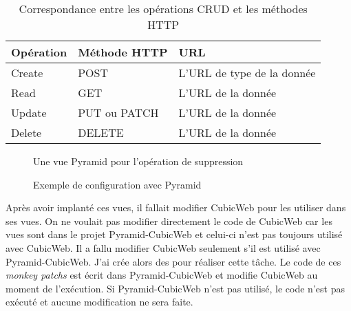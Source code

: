     \begin{table}
        \centering
        \begin{tabular}{|>{\centering\arraybackslash}m{}
        					|>{\centering\arraybackslash}m{}
        					|>{\centering\arraybackslash}m{}|}
        \hline
        \cellcolor{Gray} \textbf{Opération} & 
        \cellcolor{Gray} \textbf{Méthode HTTP} &
        \cellcolor{Gray} \textbf{URL} \\ \hline
        Create & POST & L'URL de type de la donnée\\ \hline
        Read   & GET & L'URL de la donnée\\ \hline
        Update & PUT ou PATCH & L'URL de la donnée \\ \hline
        Delete & DELETE & L'URL de la donnée \\ \hline
    \end{tabular}
    \caption{Correspondance entre les opérations CRUD et les méthodes HTTP}
    \label{table:crud}
\end{table}


\begin{figure}[htp]
    \centering
    \caption{Une vue Pyramid pour l'opération de suppression}
    \label{fig:delete}
\end{figure}

\begin{figure}[htp]
    \centering
    \caption{Exemple de configuration avec Pyramid}
    \label{fig:figpyramidconf}
\end{figure}



Après avoir implanté ces vues, il fallait modifier CubicWeb pour les utiliser dans ses vues. On ne voulait pas modifier directement le code de CubicWeb car les vues sont dans le projet Pyramid-CubicWeb et celui-ci n'est pas toujours utilisé avec CubicWeb. Il a fallu modifier CubicWeb seulement s'il est utilisé avec Pyramid-CubicWeb. J'ai crée alors des  pour réaliser cette tâche. Le code de ces \textit{monkey patchs} est écrit dans Pyramid-CubicWeb et modifie CubicWeb au moment de l'exécution. Si Pyramid-CubicWeb n'est pas utilisé, le code n'est pas exécuté et aucune modification ne sera faite.

